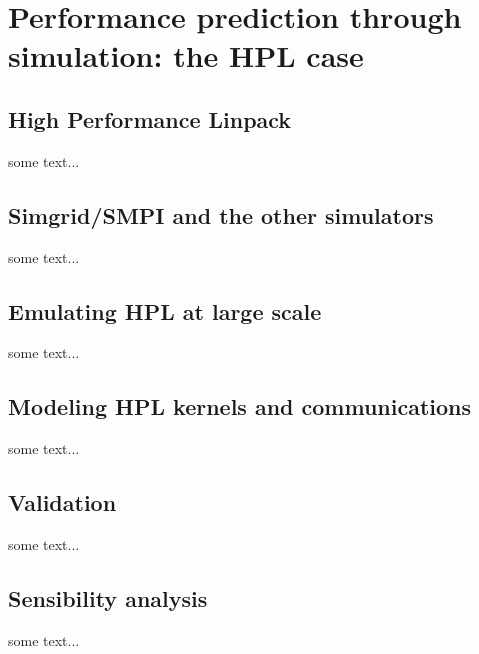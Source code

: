 \chapter{Performance prediction through simulation: the HPL case}
\label{chapter:prediction}

\section{High Performance Linpack}%
\label{sec:prediction:hpl}

    some text...

\section{Simgrid/SMPI and the other simulators}%
\label{sec:prediction:simgrid}

    some text...

\section{Emulating HPL at large scale}%
\label{sec:prediction:emulation}

    some text...

\section{Modeling HPL kernels and communications}%
\label{sec:prediction:modeling}

    some text...

\section{Validation}%
\label{sec:prediction:validation}

    some text...

\section{Sensibility analysis}%
\label{sec:prediction:sensibility}

    some text...
